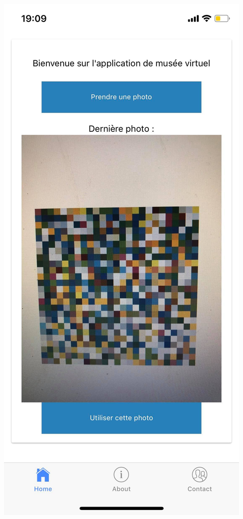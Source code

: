 \begin{frame}
\begin{columns}
\begin{column}{.33\linewidth}
                \end{column}
                \begin{column}{.33\linewidth}
                    \includegraphics[width=\linewidth]{./rsc/appli_3.png}
                \end{column}
            \end{columns}
        \end{frame}
